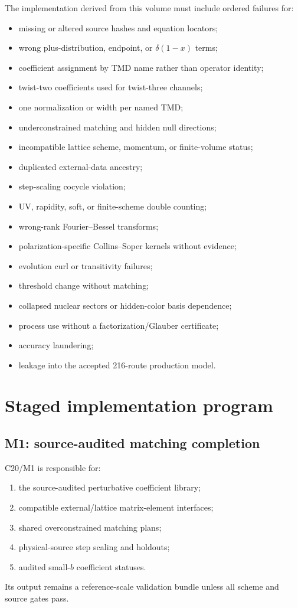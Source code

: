 \documentclass[11pt]{article}
\begin{document}
The implementation derived from this volume must include ordered failures for:
\begin{itemize}
\item missing or altered source hashes and equation locators;
\item wrong plus-distribution, endpoint, or \(\delta(1-x)\) terms;
\item coefficient assignment by TMD name rather than operator identity;
\item twist-two coefficients used for twist-three channels;
\item one normalization or width per named TMD;
\item underconstrained matching and hidden null directions;
\item incompatible lattice scheme, momentum, or finite-volume status;
\item duplicated external-data ancestry;
\item step-scaling cocycle violation;
\item UV, rapidity, soft, or finite-scheme double counting;
\item wrong-rank Fourier--Bessel transforms;
\item polarization-specific Collins--Soper kernels without evidence;
\item evolution curl or transitivity failures;
\item threshold change without matching;
\item collapsed nuclear sectors or hidden-color basis dependence;
\item process use without a factorization/Glauber certificate;
\item accuracy laundering;
\item leakage into the accepted 216-route production model.
\end{itemize}

\section{Staged implementation program}
\label{sec:stages}

\subsection{M1: source-audited matching completion}

C20/M1 is responsible for:
\begin{enumerate}
\item the source-audited perturbative coefficient library;
\item compatible external/lattice matrix-element interfaces;
\item shared overconstrained matching plans;
\item physical-source step scaling and holdouts;
\item audited small-\(b\) coefficient statuses.
\end{enumerate}
Its output remains a reference-scale validation bundle unless all scheme and source gates pass.
\end{document}
